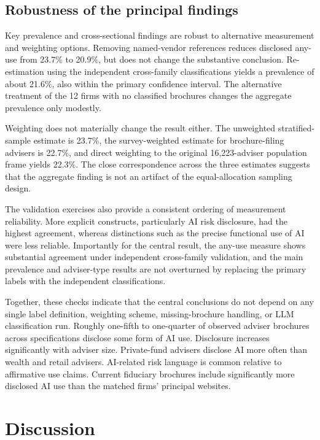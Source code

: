 \documentclass[utf8]{FrontiersinHarvard}
\begin{document}
\subsection{Robustness of the principal findings}

Key prevalence and cross-sectional findings are robust to alternative measurement and weighting options. Removing named-vendor references reduces disclosed any-use from 23.7\% to 20.9\%, but does not change the substantive conclusion. Re-estimation using the independent cross-family classifications yields a prevalence of about 21.6\%, also within the primary confidence interval. The alternative treatment of the 12 firms with no classified brochures changes the aggregate prevalence only modestly.

Weighting does not materially change the result either. The unweighted stratified-sample estimate is 23.7\%, the survey-weighted estimate for brochure-filing advisers is 22.7\%, and direct weighting to the original 16{,}223-adviser population frame yields 22.3\%. The close correspondence across the three estimates suggests that the aggregate finding is not an artifact of the equal-allocation sampling design.

The validation exercises also provide a consistent ordering of measurement reliability. More explicit constructs, particularly AI risk disclosure, had the highest agreement, whereas distinctions such as the precise functional use of AI were less reliable. Importantly for the central result, the any-use measure shows substantial agreement under independent cross-family validation, and the main prevalence and adviser-type results are not overturned by replacing the primary labels with the independent classifications.

Together, these checks indicate that the central conclusions do not depend on any single label definition, weighting scheme, missing-brochure handling, or LLM classification run. Roughly one-fifth to one-quarter of observed adviser brochures across specifications disclose some form of AI use. Disclosure increases significantly with adviser size. Private-fund advisers disclose AI more often than wealth and retail advisers. AI-related risk language is common relative to affirmative use claims. Current fiduciary brochures include significantly more disclosed AI use than the matched firms' principal websites.

\section{Discussion}
\end{document}
